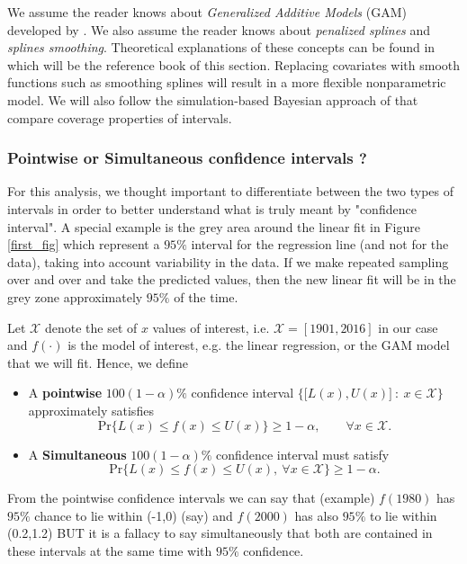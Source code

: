 We assume the reader knows about \emph{ Generalized Additive Models} (GAM) developed by \citet{hastie_generalized_1986}. We also assume the reader knows about \emph{penalized splines} and \emph{splines smoothing}. Theoretical explanations of these concepts can be found in \citet[chapter 3, 6 and 11]{ruppert_semiparametric_2003} which will be the reference book of this section. Replacing covariates with smooth functions such as smoothing splines will result in a more flexible nonparametric model. We will also follow the simulation-based Bayesian approach of \citet{marra_coverage_2012} that compare coverage properties of intervals.


\subsubsection*{Pointwise or Simultaneous confidence intervals ?}

For this analysis, we thought important to differentiate between the two types of intervals in order to better understand what is truly meant by "confidence interval". A special example is the grey area around the linear fit in Figure \ref{first_fig} which represent a $95\%$ interval for the regression line (and not for the data), taking into account variability in the data. If we make repeated sampling over and over and take the predicted values, then the new linear fit will be in the grey zone approximately $95\%$ of the time.

Let $\mathcal{X}$ denote the set of $x$ values of interest, i.e. $\mathcal{X}=[1901,2016]$ in our case and $f(\cdot)$ is the model of interest, e.g. the linear regression, or the GAM model that we will fit. Hence, we define 
\begin{itemize}
	\item A \textbf{pointwise} $100(1-\alpha)\%$ confidence interval $\Big\{\big[L(x),U(x)\big] \ : \ x\in \mathcal{X}\Big\}$ approximately satisfies
	\begin{equation}
	\text{Pr}\Big\{L(x)\leq f(x)\leq U(x)\Big\}\geq 1-\alpha, \qquad \forall x\in\mathcal{X}.
	\end{equation}
	
	\item A \textbf{Simultaneous} $100(1-\alpha)\%$ confidence interval must satisfy 
	\begin{equation}
	\text{Pr}\Big\{L(x)\leq f(x)\leq U(x), \ \forall x\in\mathcal{X}\Big\}\geq 1-\alpha.
	\end{equation}
\end{itemize} 
From the pointwise confidence intervals we can say that (example) $f(1980)$ has $95\%$ chance to lie within (-1,0) (say) and $f(2000)$ has also $95\%$ to lie within (0.2,1.2) BUT it is a fallacy to say simultaneously that both are contained in these intervals at the same time with $95\%$ confidence.%

